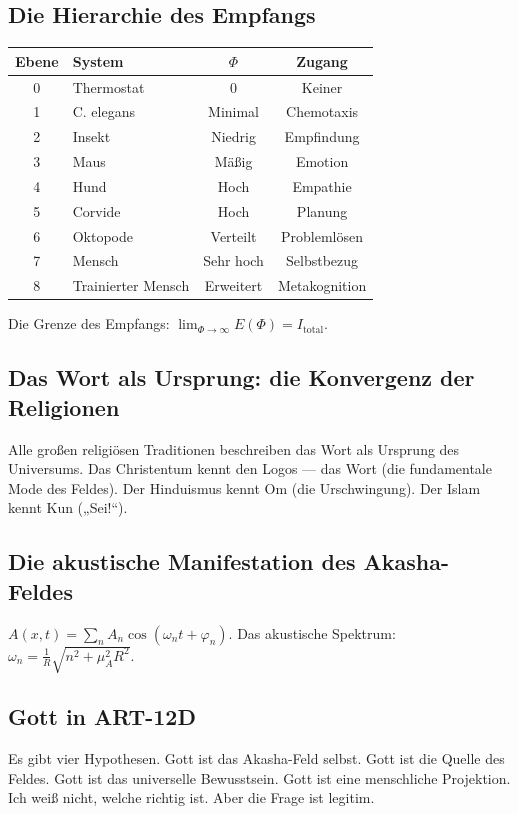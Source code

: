\subsection{Die Hierarchie des Empfangs}
\begin{table}[H]
\centering
\begin{tabular}{@{}clcc@{}}
\toprule
\textbf{Ebene} & \textbf{System} & \textbf{$\Phi$} & \textbf{Zugang} \\ \midrule
0 & Thermostat & 0 & Keiner \\
1 & C. elegans & Minimal & Chemotaxis \\
2 & Insekt & Niedrig & Empfindung \\
3 & Maus & Mäßig & Emotion \\
4 & Hund & Hoch & Empathie \\
5 & Corvide & Hoch & Planung \\
6 & Oktopode & Verteilt & Problemlösen \\
7 & Mensch & Sehr hoch & Selbstbezug \\
8 & Trainierter Mensch & Erweitert & Metakognition \\ \bottomrule
\end{tabular}
\end{table}
Die Grenze des Empfangs: $\lim_{\Phi \rightarrow \infty} E(\Phi) = I_{\text{total}}$.

\subsection{Das Wort als Ursprung: die Konvergenz der Religionen}
Alle großen religiösen Traditionen beschreiben das Wort als Ursprung des Universums. Das Christentum kennt den Logos --- das Wort (die fundamentale Mode des Feldes). Der Hinduismus kennt Om (die Urschwingung). Der Islam kennt Kun („Sei!``).

\subsection{Die akustische Manifestation des Akasha-Feldes}
$A(x,t) = \sum_n A_n \cos(\omega_n t + \varphi_n)$. Das akustische Spektrum: $\omega_n = \frac{1}{R} \sqrt{n^2 + \mu_A^2 R^2}$.

\subsection{Gott in ART-12D}
Es gibt vier Hypothesen. Gott ist das Akasha-Feld selbst. Gott ist die Quelle des Feldes. Gott ist das universelle Bewusstsein. Gott ist eine menschliche Projektion. Ich weiß nicht, welche richtig ist. Aber die Frage ist legitim.

